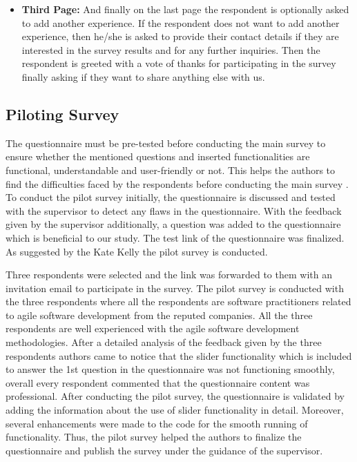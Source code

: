 \documentclass[a4paper,oneside]{bth}
\begin{document}
\begin{itemize}
\item \textbf{Third Page:} And finally on the last page the respondent is optionally asked to add another experience. If the respondent does not want to add another experience, then he/she is asked to provide their contact details if they are interested in the survey results and for any further inquiries. Then the respondent is greeted with a vote of thanks for participating in the survey finally asking if they want to share anything else with us.
\end{itemize}
\subsection{Piloting Survey}
The questionnaire must be pre-tested before conducting the main survey to ensure whether the mentioned questions and inserted functionalities are functional, understandable and user-friendly or not. This helps the authors to find the difficulties faced by the respondents before conducting the main survey \cite{kelley_good_2003}. To conduct the pilot survey initially, the questionnaire is discussed and tested with the supervisor to detect any flaws in the questionnaire. With the feedback given by the supervisor additionally, a question was added to the questionnaire which is beneficial to our study. The test link of the questionnaire was finalized. As suggested by the Kate Kelly \cite{kelley_good_2003} the pilot survey is conducted.

Three respondents were selected and the link was forwarded to them with an invitation email to participate in the survey. The pilot survey is conducted with the three respondents where all the respondents are software practitioners related to agile software development from the reputed companies. All the three respondents are well experienced with the agile software development methodologies. After a detailed analysis of the feedback given by the three respondents authors came to notice that the slider functionality which is included to answer the 1st question in the questionnaire was not functioning smoothly, overall every respondent commented that the questionnaire content was professional. After conducting the pilot survey, the questionnaire is validated by adding the information about the use of slider functionality in detail. Moreover, several enhancements were made to the code for the smooth running of functionality. Thus, the pilot survey helped the authors to finalize the questionnaire and publish the survey under the guidance of the supervisor.
\end{document}
